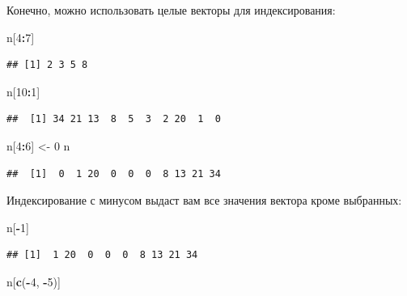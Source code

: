 \documentclass[]{book}
\newenvironment{Shaded}{\begin{snugshade}}{\end{snugshade}}
\newcommand{\KeywordTok}[1]{\textcolor[rgb]{0.13,0.29,0.53}{\textbf{#1}}}
\newcommand{\DecValTok}[1]{\textcolor[rgb]{0.00,0.00,0.81}{#1}}
\newcommand{\StringTok}[1]{\textcolor[rgb]{0.31,0.60,0.02}{#1}}
\newcommand{\OperatorTok}[1]{\textcolor[rgb]{0.81,0.36,0.00}{\textbf{#1}}}
\newcommand{\NormalTok}[1]{#1}
\begin{document}
Конечно, можно использовать целые векторы для индексирования:

\begin{Shaded}
\begin{Highlighting}[]
\NormalTok{n[}\DecValTok{4}\OperatorTok{:}\DecValTok{7}\NormalTok{]}
\end{Highlighting}
\end{Shaded}

\begin{verbatim}
## [1] 2 3 5 8
\end{verbatim}

\begin{Shaded}
\begin{Highlighting}[]
\NormalTok{n[}\DecValTok{10}\OperatorTok{:}\DecValTok{1}\NormalTok{]}
\end{Highlighting}
\end{Shaded}

\begin{verbatim}
##  [1] 34 21 13  8  5  3  2 20  1  0
\end{verbatim}

\begin{Shaded}
\begin{Highlighting}[]
\NormalTok{n[}\DecValTok{4}\OperatorTok{:}\DecValTok{6}\NormalTok{] <-}\StringTok{ }\DecValTok{0}
\NormalTok{n}
\end{Highlighting}
\end{Shaded}

\begin{verbatim}
##  [1]  0  1 20  0  0  0  8 13 21 34
\end{verbatim}

Индексирование с минусом выдаст вам все значения вектора кроме
выбранных:

\begin{Shaded}
\begin{Highlighting}[]
\NormalTok{n[}\OperatorTok{-}\DecValTok{1}\NormalTok{]}
\end{Highlighting}
\end{Shaded}

\begin{verbatim}
## [1]  1 20  0  0  0  8 13 21 34
\end{verbatim}

\begin{Shaded}
\begin{Highlighting}[]
\NormalTok{n[}\KeywordTok{c}\NormalTok{(}\OperatorTok{-}\DecValTok{4}\NormalTok{, }\OperatorTok{-}\DecValTok{5}\NormalTok{)]}
\end{Highlighting}
\end{Shaded}
\end{document}
